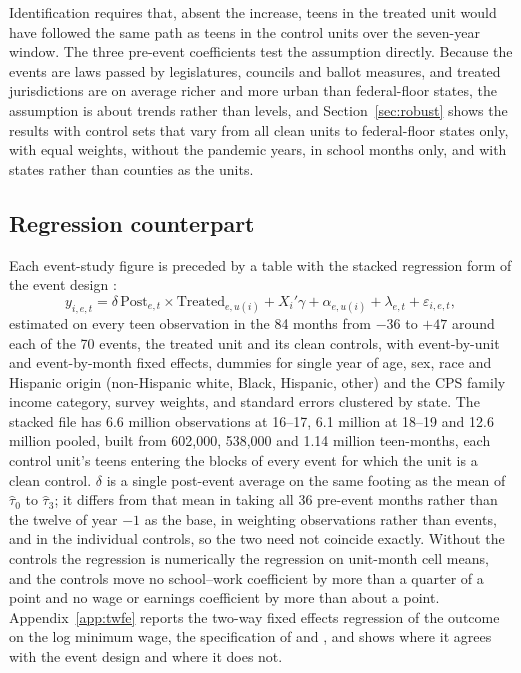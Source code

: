 \documentclass[12pt]{article}
\begin{document}
Identification requires that, absent the increase, teens in the treated unit would have followed the same path as teens in the control units over the seven-year window. The three pre-event coefficients test the assumption directly. Because the events are laws passed by legislatures, councils and ballot measures, and treated jurisdictions are on average richer and more urban than federal-floor states, the assumption is about trends rather than levels, and Section~\ref{sec:robust} shows the results with control sets that vary from all clean units to federal-floor states only, with equal weights, without the pandemic years, in school months only, and with states rather than counties as the units.

\subsection{Regression counterpart}\label{sec:reg}

Each event-study figure is preceded by a table with the stacked regression form of the event design \citep{cengiz2019}:
\begin{equation}
y_{i,e,t} = \delta\, \mathrm{Post}_{e,t} \times \mathrm{Treated}_{e,u(i)} + X_i'\gamma + \alpha_{e,u(i)} + \lambda_{e,t} + \varepsilon_{i,e,t},
\label{eq:stacked}
\end{equation}
estimated on every teen observation in the 84 months from $-36$ to $+47$ around each of the 70 events, the treated unit and its clean controls, with event-by-unit and event-by-month fixed effects, dummies for single year of age, sex, race and Hispanic origin (non-Hispanic white, Black, Hispanic, other) and the CPS family income category, survey weights, and standard errors clustered by state. The stacked file has 6.6 million observations at 16--17, 6.1 million at 18--19 and 12.6 million pooled, built from 602,000, 538,000 and 1.14 million teen-months, each control unit's teens entering the blocks of every event for which the unit is a clean control. $\delta$ is a single post-event average on the same footing as the mean of $\hat\tau_0$ to $\hat\tau_3$; it differs from that mean in taking all 36 pre-event months rather than the twelve of year $-1$ as the base, in weighting observations rather than events, and in the individual controls, so the two need not coincide exactly. Without the controls the regression is numerically the regression on unit-month cell means, and the controls move no school--work coefficient by more than a quarter of a point and no wage or earnings coefficient by more than about a point. Appendix~\ref{app:twfe} reports the two-way fixed effects regression of the outcome on the log minimum wage, the specification of \citet{neumark2019} and \citet{smith2021}, and shows where it agrees with the event design and where it does not.
\end{document}
